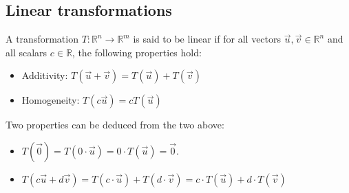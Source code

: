 \subsection{Linear transformations}
\begin{definition}
    A transformation $T: \mathbb{R}^n \to \mathbb{R}^m$ is said to be linear if for all vectors $\vec{u}, \vec{v} \in \mathbb{R}^n$ and all scalars $c \in \mathbb{R}$, the following properties hold:
    \begin{itemize}[itemsep=1pt,label=$\circ$]
        \item Additivity: $T(\vec{u} + \vec{v}) = T(\vec{u}) + T(\vec{v})$
        \item Homogeneity: $T(c \vec{u}) = c T(\vec{u})$
    \end{itemize}
\end{definition}
Two properties can be deduced from the two above:
\begin{itemize}[itemsep=1pt,label=$\circ$]
    \item $T(\vec{0}) = T(0 \cdot \vec{u}) = 0 \cdot T(\vec{u}) = \vec{0}$.
    \item $T(c \vec{u} + d \vec{v}) = T(c \cdot \vec{u}) + T(d \cdot \vec{v}) = c \cdot T(\vec{u}) + d \cdot T(\vec{v})$
\end{itemize}

